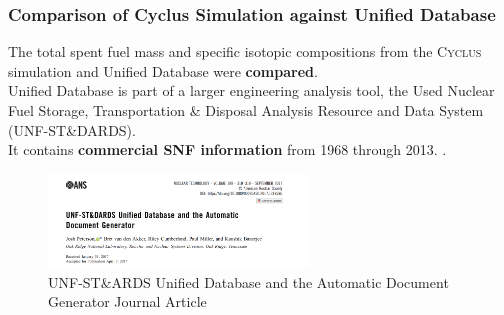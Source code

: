 \begin{frame}
    \frametitle{Comparison of Cyclus Simulation against Unified Database}
    The total spent fuel mass and specific isotopic compositions from the \textsc{Cyclus} 
        simulation and Unified Database were \textbf{compared}. 
        \\ 
        
    Unified Database is part of a larger engineering analysis tool, the Used Nuclear Fuel Storage, 
    Transportation \& Disposal Analysis Resource and Data System (UNF-ST\&DARDS). 
    \\

    It contains \textbf{commercial SNF information} from 1968 through 2013. \cite{peterson_unf_2017}. 
        \\ 
        
        \begin{figure}[htbp!]
            \begin{center}
                \includegraphics[height=2.5cm]{../figures/peterson-unf}
            \end{center}
                    \caption{UNF-ST\&ARDS Unified Database and the Automatic
                    Document Generator Journal Article}
            \label{fig:peterson-unf}
            \end{figure}
\end{frame}
  